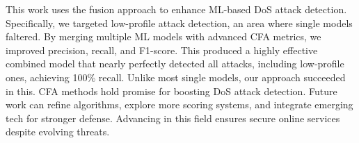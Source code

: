 This work uses the fusion approach to enhance ML-based DoS attack detection. Specifically, we targeted low-profile attack detection, an area where single models faltered. By merging multiple ML models with advanced CFA metrics, we improved precision, recall, and F1-score. This produced a highly effective combined model that nearly perfectly detected all attacks, including low-profile ones, achieving 100\% recall. Unlike most single models, our approach succeeded in this. CFA methods hold promise for boosting DoS attack detection. Future work can refine algorithms, explore more scoring systems, and integrate emerging tech for stronger defense. Advancing in this field ensures secure online services despite evolving threats.

